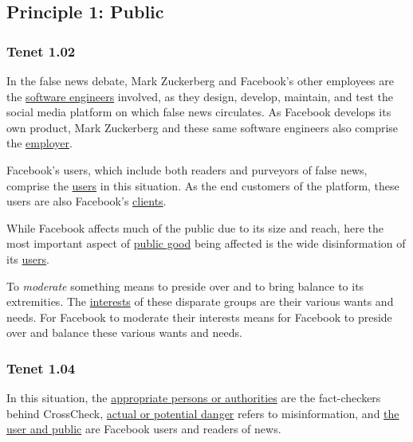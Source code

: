 
\subsection{Principle 1: Public}

\subsubsection{Tenet 1.02}


\par In the false news debate, Mark Zuckerberg and Facebook's other employees are the \ul{software engineers} involved, as they design, develop, maintain, and test the social media platform on which false news circulates. As Facebook develops its own product, Mark Zuckerberg and these same software engineers also comprise the \ul{employer}. 

\par Facebook's users, which include both readers and purveyors of false news, comprise the \ul{users} in this situation. As the end customers of the platform, these users are also Facebook's \ul{clients}.

\par While Facebook affects much of the public due to its size and reach, here the most important aspect of \ul{public good} being affected is the wide disinformation of its \ul{users}.

\par To \emph{moderate} something means to preside over and to bring balance to its extremities. \cite{dictionary} The \ul{interests} of these disparate groups are their various wants and needs. For Facebook to moderate their interests means for Facebook to preside over and balance these various wants and needs. 


\subsubsection{Tenet 1.04}


In this situation, the \ul{appropriate persons or authorities} are the fact-checkers behind CrossCheck, \ul{actual or potential danger} refers to misinformation, and \ul{the user and public} are Facebook users and readers of news.

